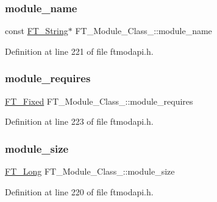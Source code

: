\subsubsection{\texorpdfstring{module\_name}{module\_name}}
{\footnotesize\ttfamily const \mbox{\hyperlink{fttypes_8h_a9846214585359eb2ba6bbb0e6de30639}{F\+T\+\_\+\+String}}$\ast$ F\+T\+\_\+\+Module\+\_\+\+Class\+\_\+\+::module\+\_\+name}



Definition at line 221 of file ftmodapi.\+h.

\mbox{\label{struct_f_t___module___class___a24772981bd972d342f54a6e1704f85c3}} 
\subsubsection{\texorpdfstring{module\_requires}{module\_requires}}
{\footnotesize\ttfamily \mbox{\hyperlink{fttypes_8h_a5f5a679cc09f758efdd0d1c5feed3c3d}{F\+T\+\_\+\+Fixed}} F\+T\+\_\+\+Module\+\_\+\+Class\+\_\+\+::module\+\_\+requires}



Definition at line 223 of file ftmodapi.\+h.

\mbox{\label{struct_f_t___module___class___a2582eeab364e4fbbd5d1e420bfcf3207}} 
\subsubsection{\texorpdfstring{module\_size}{module\_size}}
{\footnotesize\ttfamily \mbox{\hyperlink{fttypes_8h_a7fa72a1f0e79fb1860c5965789024d6f}{F\+T\+\_\+\+Long}} F\+T\+\_\+\+Module\+\_\+\+Class\+\_\+\+::module\+\_\+size}



Definition at line 220 of file ftmodapi.\+h.

\mbox{\label{struct_f_t___module___class___a5b649f1965c42fd8c54bbc370fbf60b4}} 
